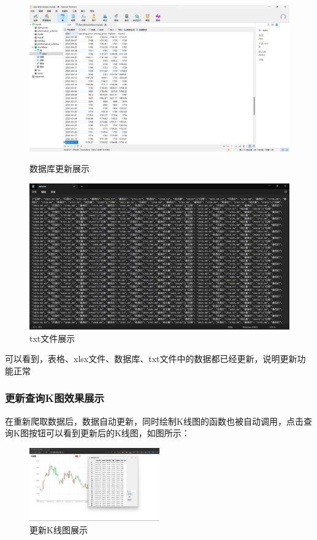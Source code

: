 \documentclass[UTF8,12pt]{article}
\begin{document}
\begin{figure}[htbp]
	\begin{minipage}{0.49\linewidth}
		\centering
		\includegraphics[width=0.9\linewidth]{img/18.png}
		\caption{数据库更新展示}
		\label{7}%
	\end{minipage}
	\begin{minipage}{0.49\linewidth}
		\centering
		\includegraphics[width=0.9\linewidth]{img/20.png}
		\caption{txt文件展示}
		\label{8}%
	\end{minipage}
\end{figure}

可以看到，表格、xlsx文件、数据库、txt文件中的数据都已经更新，说明更新功能正常

\subsubsection{更新查询K图效果展示}
在重新爬取数据后，数据自动更新，同时绘制K线图的函数也被自动调用，点击查询K图按钮可以看到更新后的K线图，如图所示：

\begin{figure}[htbp]
    \centering
    \includegraphics[width=0.5\textwidth]{img/19.png}
    \caption{更新K线图展示}
\end{figure}
\end{document}
